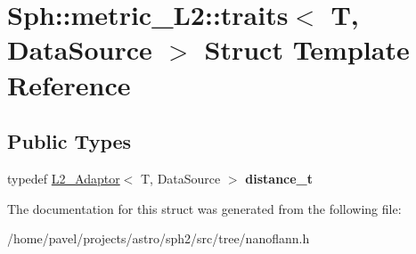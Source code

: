 \hypertarget{structSph_1_1metric__L2_1_1traits}{}\section{Sph\+:\+:metric\+\_\+\+L2\+:\+:traits$<$ T, Data\+Source $>$ Struct Template Reference}
\label{structSph_1_1metric__L2_1_1traits}
\subsection*{Public Types}
\begin{DoxyCompactItemize}
\item 
\hypertarget{structSph_1_1metric__L2_1_1traits_a70bbf992e1ddec68d6b2c4d30c357a69}{}\label{structSph_1_1metric__L2_1_1traits_a70bbf992e1ddec68d6b2c4d30c357a69} 
typedef \hyperlink{structSph_1_1L2__Adaptor}{L2\+\_\+\+Adaptor}$<$ T, Data\+Source $>$ {\bfseries distance\+\_\+t}
\end{DoxyCompactItemize}


The documentation for this struct was generated from the following file\+:\begin{DoxyCompactItemize}
\item 
/home/pavel/projects/astro/sph2/src/tree/nanoflann.\+h\end{DoxyCompactItemize}
